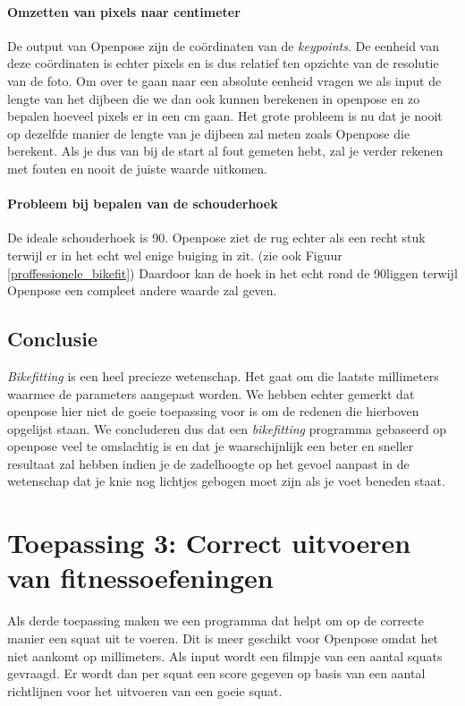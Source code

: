 \documentclass[a4paper,twoside,kulak]{kulakreport}
\begin{document}
\paragraph{Omzetten van pixels naar centimeter}
De output van Openpose zijn de coördinaten van de \textit{keypoints}. De eenheid van deze coördinaten is echter pixels en is dus relatief ten opzichte van de resolutie van de foto. Om over te gaan naar een absolute eenheid vragen we als input de lengte van het dijbeen die we dan ook kunnen berekenen in openpose en zo bepalen hoeveel pixels er in een \si{cm} gaan. Het grote probleem is nu dat je nooit op dezelfde manier de lengte van je dijbeen zal meten zoals Openpose die berekent. Als je dus van bij de start al fout gemeten hebt, zal je verder rekenen met fouten en nooit de juiste waarde uitkomen.

\paragraph{Probleem bij bepalen van de schouderhoek}
De ideale schouderhoek is 90\degree. Openpose ziet de rug echter als een recht stuk terwijl er in het echt wel enige buiging in zit. (zie ook Figuur \ref{proffessionele_bikefit}) Daardoor kan de hoek in het echt rond de 90\degree liggen terwijl Openpose een compleet andere waarde zal geven.

\subsection{Conclusie}
\textit{Bikefitting} is een heel precieze wetenschap. Het gaat om die laatste millimeters waarmee de parameters aangepast worden. We hebben echter gemerkt dat openpose hier niet de goeie toepassing voor is om de redenen die hierboven opgelijst staan. We concluderen dus dat een \textit{bikefitting} programma gebaseerd op openpose veel te omslachtig is en dat je waarschijnlijk een beter en sneller resultaat zal hebben indien je de zadelhoogte op het gevoel aanpast in de wetenschap dat je knie nog lichtjes gebogen moet zijn als je voet beneden staat.


\section{Toepassing 3: Correct uitvoeren van fitnessoefeningen}

Als derde toepassing maken we een programma dat helpt om op de correcte manier een squat uit te voeren. Dit is meer geschikt voor Openpose omdat het niet aankomt op millimeters. Als input wordt een filmpje van een aantal squats gevraagd. Er wordt dan per squat een score gegeven op basis van een aantal richtlijnen voor het uitvoeren van een goeie squat.\cite{squats} 
\end{document}
